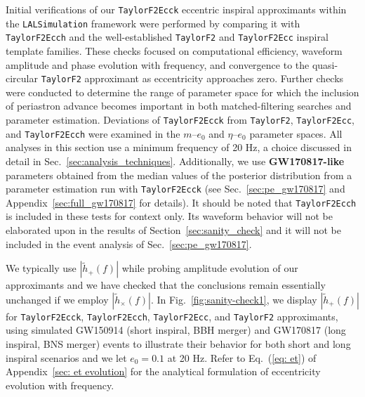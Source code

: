 \documentclass[aps,prd,twocolumn,superscriptaddress,groupedaddress,nofootinbib,showpacs,eqsecnum,useAms]{revtex4-2}
\begin{document}
Initial verifications of our  \texttt{TaylorF2Ecck} eccentric inspiral approximants within the \texttt{LALSimulation} framework were performed by comparing it with \texttt{TaylorF2Ecch} and the well-established \texttt{TaylorF2} and \texttt{TaylorF2Ecc} inspiral template families. These checks focused on computational efficiency, waveform amplitude and phase evolution with frequency, and convergence to the quasi-circular \texttt{TaylorF2}  approximant as eccentricity approaches zero. 
Further checks were conducted to determine the range of parameter space for which the inclusion of periastron advance becomes important in both matched-filtering searches and parameter estimation. Deviations of \texttt{TaylorF2Ecck} from \texttt{TaylorF2}, \texttt{TaylorF2Ecc}, and \texttt{TaylorF2Ecch} were examined in the $m$--$e_0$ and $\eta$--$e_0$ parameter spaces. 
All analyses in this section use a minimum frequency of 20 Hz, a choice discussed in detail in Sec.~\ref{sec:analysis_techniques}.
Additionally, we use {\bf GW170817-like} parameters obtained from the median values of the posterior distribution from a parameter estimation run with \texttt{TaylorF2Ecck} (see Sec.~\ref{sec:pe_gw170817} and Appendix~\ref{sec:full_gw170817} for details).
It should be noted that \texttt{TaylorF2Ecch} is included in these tests for context only. Its waveform behavior will not be elaborated upon in the results of Section~\ref{sec:sanity_check} and it will not be included in the event analysis of Sec.~\ref{sec:pe_gw170817}.

 We typically use $|\tilde{h}_+(f)|$  while probing amplitude evolution of our approximants 
 and we have checked that the conclusions remain essentially  unchanged if we employ $|\tilde{h}_\times (f)|$.
 In  Fig.~\ref{fig:sanity-check1}, we display $|\tilde{h}_+(f)|$ for \texttt{TaylorF2Ecck}, \texttt{TaylorF2Ecch}, \texttt{TaylorF2Ecc}, and \texttt{TaylorF2} approximants, using simulated GW150914 (short inspiral, BBH merger) and GW170817 (long inspiral, BNS merger) events to illustrate their behavior for both short and long inspiral scenarios and we let  $e_0 = 0.1$ at 20 Hz.
Refer to Eq.~(\ref{eq: et}) of Appendix~\ref{sec: et evolution} for the analytical formulation of eccentricity evolution with frequency.
\end{document}
